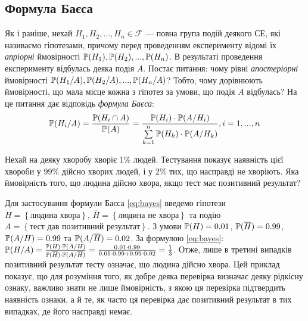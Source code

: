 \subsection{Формула Баєса}
Як і раніше, нехай $H_1, H_2, ..., H_n \in \mathcal{F}$ --- повна група подій деякого СЕ, які називаємо гіпотезами, причому
перед проведенням експерименту відомі їх \emph{апріорні} ймовірності $\P(H_1), \P(H_2), ..., \P(H_n)$.
В результаті проведення експерименту відбулась деяка подія $A$.
Постає питання: чому рівні \emph{апостеріорні} ймовірності $\P(H_1/A), \P(H_2/A), ..., \P(H_n/A)$?
Тобто, чому дорівнюють ймовірності, що мала місце кожна з гіпотез за умови, що подія $A$ відбулась? На це питання дає відповідь \emph{формула Баєса}:
\begin{equation}\label{eq:bayes}
    \P(H_i/A) = \frac{\P(H_i \cap A)}{\P(A)} = \frac{\P(H_i) \cdot \P(A/H_i)}{\sum\limits_{k=1}^n \P(H_k)\cdot \P(A/H_k)}, i = 1,...,n
\end{equation}
\begin{example}
    Нехай на деяку хворобу хворіє 1\% людей. Тестування показує наявність цієї хвороби у 99\% дійсно хворих людей,
    і у 2\% тих, що насправді не хворіють. Яка ймовірність того, що людина дійсно хвора, якщо тест має позитивний результат?
    
    Для застосування формули Баєса \eqref{eq:bayes} введемо гіпотези $H = \left\{\text{людина хвора}\right\}$, $\overline{H} = \left\{\text{людина не хвора}\right\}$ та
    подію $A = \left\{\text{тест дав позитивний результат}\right\}$.
    З умови $\P(H) = 0.01$, $\P(\overline{H}) = 0.99$, $\P(A / H) = 0.99$ та $\P(A / \overline{H}) = 0.02$.
    За формулою \eqref{eq:bayes}:
    $\P(H / A) = \frac{
        \P(H) \cdot \P(A / H)
    }{
        \P(\overline{H}) \cdot \P(A / \overline{H})
    } = \frac{
        0.01 \cdot 0.99
    }{
        0.01 \cdot 0.99 + 0.99 \cdot 0.02
    } = \frac{1}{3}
    $. 
    Отже, лише в третині випадків позитивний результат тесту означає, що людина дійсно хвора. Цей приклад показує,
    що для розуміння того, як добре деяка перевірка визначає деяку рідкісну ознаку, важливо знати не лише 
    ймовірність, з якою ця перевірка підтвердить наявність ознаки, а й те, як часто ця перевірка дає позитивний результат в тих випадках,
    де його насправді немає.
\end{example}
